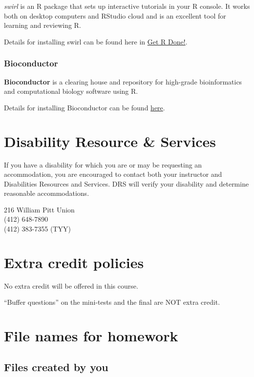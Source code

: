 \documentclass[
]{book}
\begin{document}
\emph{swirl} is an R package that sets up interactive tutorials in your R console. It works both on desktop computers and RStudio cloud and is an excellent tool for learning and reviewing R.

Details for installing swirl can be found here in \href{https://brouwern.github.io/getRdone/swirl.html\#swirl}{Get R Done!}.

\hypertarget{bioconductor}{%
\subsection{Bioconductor}\label{bioconductor}}

\textbf{Bioconductor} is a clearing house and repository for high-grade bioinformatics and computational biology software using R.

Details for installing Bioconductor can be found \href{https://brouwern.github.io/lbrb/installing-bioconductor.html}{here}.

\hypertarget{DRS}{%
\chapter{Disability Resource \& Services}\label{DRS}}

If you have a disability for which you are or may be requesting an accommodation, you are encouraged to contact both your instructor and Disabilities Resources and Services. DRS will verify your disability and determine reasonable accommodations.

216 William Pitt Union\\
(412) 648-7890\\
(412) 383-7355 (TYY)

\hypertarget{extracredit}{%
\chapter{Extra credit policies}\label{extracredit}}

No extra credit will be offered in this course.

``Buffer questions'' on the mini-tests and the final are NOT extra credit.

\hypertarget{file_names}{%
\chapter{File names for homework}\label{file_names}}

\hypertarget{files-created-by-you}{%
\section{Files created by you}\label{files-created-by-you}}
\end{document}

